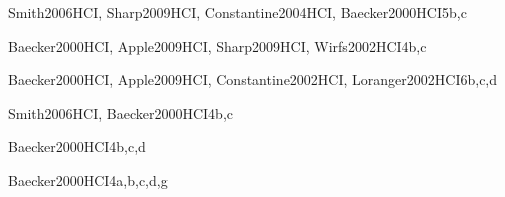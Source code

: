 \begin{syllabus}
	
	\begin{unit}{\HCIUsercentereddesignandtesting}{}{Smith2006HCI, Sharp2009HCI, Constantine2004HCI, Baecker2000HCI}{5}{b,c}
		\HCIUsercentereddesignandtestingAllTopics
		\HCIUsercentereddesignandtestingAllLearningOutcomes
	\end{unit}
	
	
	\begin{unit}{\HCIDesigningInteraction}{}{Baecker2000HCI, Apple2009HCI, Sharp2009HCI, Wirfs2002HCI}{4}{b,c}
		\HCIDesigningInteractionAllTopics
		\HCIDesigningInteractionAllLearningOutcomes
	\end{unit}
	
	\begin{unit}{\ARInterfacingandcommunication}{}{Baecker2000HCI, Apple2009HCI, Constantine2002HCI, Loranger2002HCI}{6}{b,c,d}
		\ARInterfacingandcommunicationAllTopics
		\ARInterfacingandcommunicationAllLearningOutcomes
	\end{unit}
	
	
	\begin{unit}{\IMMultimediaSystems}{}{Smith2006HCI, Baecker2000HCI}{4}{b,c}
		\IMMultimediaSystemsAllTopics
		\IMMultimediaSystemsAllLearningOutcomes
	\end{unit}
	
	\begin{unit}{\SPProfessionalCommunication}{}{Baecker2000HCI}{4}{b,c,d}
		\SPProfessionalCommunicationAllTopics
		\SPProfessionalCommunicationAllLearningOutcomes
	\end{unit}
	
	
	\begin{unit}{\HCIHumanfactorsandsecurity}{}{Baecker2000HCI}{4}{a,b,c,d,g}
		\HCIHumanfactorsandsecurityAllTopics
		\HCIHumanfactorsandsecurityAllLearningOutcomes
	\end{unit}
	
	\begin{coursebibliography}
	\end{coursebibliography}
	\end{syllabus}
	
